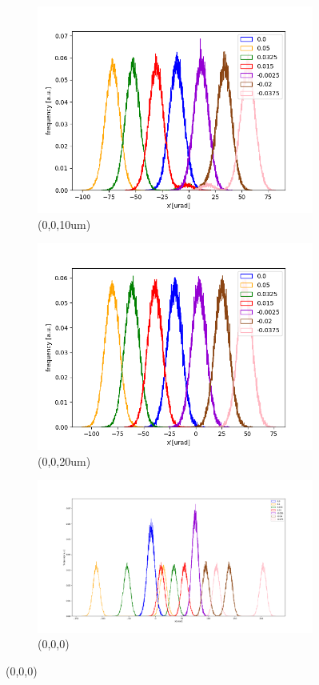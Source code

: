 \documentclass[a4paper]{article}
\begin{document}
\begin{figure}[H]
\begin{subfigure}{0.4\textwidth}
		\includegraphics[width=\textwidth]{10um.png}
        \caption{(0,0,10um)}
	\end{subfigure}
	\vspace{2em}
	\begin{subfigure}{0.4\textwidth}
		\includegraphics[width=\textwidth]{20um.png}
        \caption{(0,0,20um)}
	\end{subfigure}
	\begin{subfigure}{0.5\textwidth}
    	\centering
		\includegraphics[width=\textwidth]{0.png}
        \caption{(0,0,0)}
	\end{subfigure}
    

\end{figure}
\end{document}
